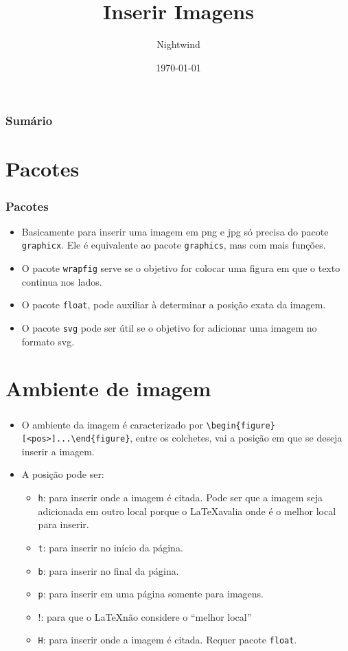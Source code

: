 \documentclass{beamer}
\title{Inserir Imagens}
\author{Nightwind}
\institute[CTISM]{Colégio Técnico Industrial de Santa Maria}
\date{\today}
\begin{document}
\frame{\titlepage}

\begin{frame}
    \frametitle{Sumário}
    \tableofcontents
\end{frame}

\section{Pacotes}

\begin{frame}[fragile]
    \frametitle{Pacotes}

    \begin{itemize}
        \item Basicamente para inserir uma imagem em png e jpg só precisa do pacote \texttt{graphicx}. Ele é equivalente ao pacote \texttt{graphics}, mas com mais funções.
        \item O pacote \texttt{wrapfig} serve se o objetivo for colocar uma figura em que o texto continua nos lados.
        \item O pacote \texttt{float}, pode auxiliar à determinar a posição exata da imagem.
        \item O pacote \texttt{svg} pode ser útil se o objetivo for adicionar uma imagem no formato svg.
    \end{itemize}

\end{frame}

\section{Ambiente de imagem}

\begin{frame}[fragile]
    \frametitle{}
    \begin{itemize}
        \item O ambiente da imagem é caracterizado por \lstinline[style=myStyleLatex]!\begin{figure}[<pos>]...\end{figure}!, entre os colchetes, vai a posição em que se deseja inserir a imagem.
        \item A posição pode ser:
              \begin{itemize}
                  \item \texttt{h}: para inserir onde a imagem é citada. Pode ser que a imagem seja adicionada em outro local porque o \LaTeX avalia onde é o melhor local para inserir.
                  \item \texttt{t}: para inserir no início da página.
                  \item \texttt{b}: para inserir no final da página.
                  \item \texttt{p}: para inserir em uma página somente para imagens.
                  \item !: para que o \LaTeX não considere o ``melhor local''
                  \item \texttt{H}: para inserir onde a imagem é citada. Requer pacote \texttt{float}.
              \end{itemize}
    \end{itemize}
\end{frame}
\end{document}
